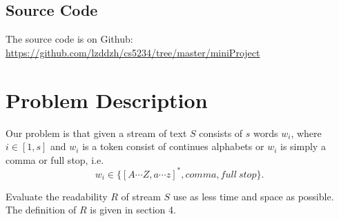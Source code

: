 \documentclass{article}
\begin{document}
\subsection{Source Code}
The source code is on Github:\\\url{https://github.com/lzddzh/cs5234/tree/master/miniProject}


 
\section{Problem Description}
Our problem is that given a stream of text $S$ consists of $s$ words $w_i$, where $i\in[1,s]$ and $w_i$ is a token consist of continues alphabets or $w_i$ is simply a comma or full stop,
i.e.
\[w_i \in \{[A \cdots Z, a \cdots z]^*, comma, full\ stop\}.\]

Evaluate the readability $R$ of stream $S$ use as less time and space as possible. The definition of $R$ is given in section 4.
\end{document}

